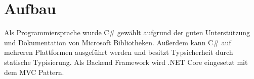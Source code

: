 \section{Aufbau}
Als Programmiersprache wurde C\# gewählt aufgrund der guten Unterstützung und Dokumentation von Microsoft Bibliotheken. Außerdem kann C\# auf mehreren Plattformen ausgeführt werden und besitzt Typsicherheit durch statische Typisierung. Als Backend Framework wird .NET Core eingesetzt mit dem \ac{MVC} Pattern.
